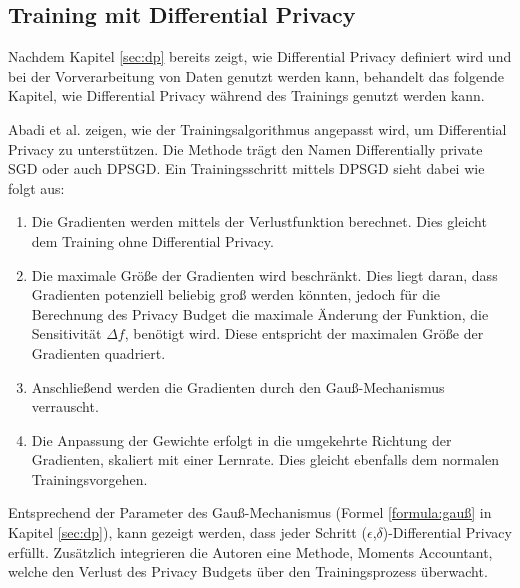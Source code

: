 \subsection{Training mit Differential Privacy}\label{sec:dp_training}

Nachdem Kapitel \ref{sec:dp} bereits zeigt, wie Differential Privacy definiert wird und bei der Vorverarbeitung von Daten genutzt werden kann, behandelt das folgende Kapitel, wie Differential Privacy während des Trainings genutzt werden kann.

Abadi et al. \cite{P-28} zeigen, wie der Trainingsalgorithmus angepasst wird, um Differential Privacy zu unterstützen.
Die Methode trägt den Namen Differentially private SGD oder auch DPSGD.
Ein Trainingsschritt mittels DPSGD sieht dabei wie folgt aus:
\begin{enumerate}
    \item Die Gradienten werden mittels der Verlustfunktion berechnet. Dies gleicht dem Training ohne Differential Privacy.
    \item Die maximale Größe der Gradienten wird beschränkt. Dies liegt daran, dass Gradienten potenziell beliebig groß werden könnten, jedoch für die Berechnung des Privacy Budget die maximale Änderung der Funktion, die Sensitivität $\Delta f$, benötigt wird. Diese entspricht der maximalen Größe der Gradienten quadriert.
    \item Anschließend werden die Gradienten durch den Gauß-Mechanismus verrauscht. 
    \item Die Anpassung der Gewichte erfolgt in die umgekehrte Richtung der Gradienten, skaliert mit einer Lernrate. Dies gleicht ebenfalls dem normalen Trainingsvorgehen.
\end{enumerate}

Entsprechend der Parameter des Gauß-Mechanismus (Formel \ref{formula:gauß} in Kapitel \ref{sec:dp}), kann gezeigt werden, dass jeder Schritt ($\epsilon$,$\delta$)-Differential Privacy erfüllt.
Zusätzlich integrieren die Autoren eine Methode, Moments Accountant, welche den Verlust des Privacy Budgets über den Trainingsprozess überwacht.